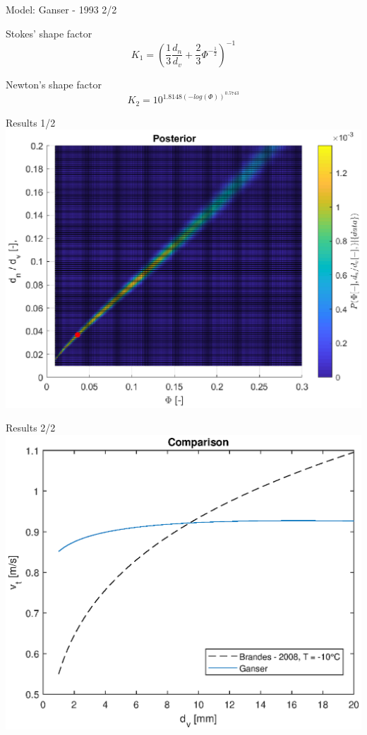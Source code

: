 \documentclass[11pt]{beamer}
\begin{document}
	\begin{frame}{Model: Ganser - 1993  2/2}
		\begin{block}{Stokes' shape factor}
			\begin{equation*}
			K_1 = \left( \frac{1}{3} \frac{d_n}{d_v} + \frac{2}{3} \Phi^{-\frac{1}{2}} \right)^{-1} 
			\end{equation*}
		\end{block}
		\begin{block}{Newton's shape factor}
			\begin{equation*}
			K_2 = 10^{1.8148 (-log(\Phi))^{0.5743}}
			\end{equation*}
		\end{block}
	\end{frame}
	
	\begin{frame}{Results 1/2}
		\centering
		\includegraphics[width=\linewidth]{GanserPost.eps}
	\end{frame}
	
	\begin{frame}{Results 2/2}
		\centering
		\includegraphics[width=\linewidth]{GanserComparison.eps}
	\end{frame}
\end{document}
